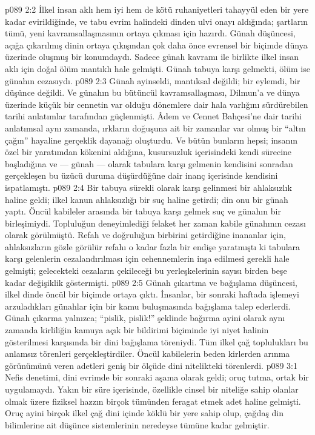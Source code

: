 \vs p089 2:2 İlkel insan aklı hem iyi hem de kötü ruhaniyetleri tahayyül eden bir yere kadar evirildiğinde, ve tabu evrim halindeki dinden ulvi onayı aldığında; şartların tümü,  yeni kavramsallaşmasının ortaya çıkması için hazırdı. Günah düşüncesi, açığa çıkarılmış dinin ortaya çıkışından çok daha önce evrensel bir biçimde dünya üzerinde oluşmuş bir konumdaydı. Sadece günah kavramı ile birlikte ilkel insan aklı için doğal ölüm mantıklı hale gelmişti. Günah tabuya karşı gelmekti, ölüm ise günahın cezasıydı.
\vs p089 2:3 Günah ayinseldi, mantıksal değildi; bir eylemdi, bir düşünce değildi. Ve günahın bu bütüncül kavramsallaşması, Dilmun’a ve dünya üzerinde küçük bir cennetin var olduğu dönemlere dair hala varlığını sürdürebilen tarihi anlatımlar tarafından güçlenmişti. Âdem ve Cennet Bahçesi’ne dair tarihi anlatımsal aynı zamanda, ırkların doğuşuna ait bir zamanlar var olmuş bir “altın çağın” hayaline gerçeklik dayanağı oluşturdu. Ve bütün bunların hepsi; insanın özel bir yaratımdan kökenini aldığına, kusursuzluk içerisindeki kendi sürecine başladığına ve --- günah --- olarak tabulara karşı gelmenin kendisini sonradan gerçekleşen bu üzücü duruma düşürdüğüne dair inanç içerisinde kendisini ispatlamıştı.
\vs p089 2:4 Bir tabuya sürekli olarak karşı gelinmesi bir ahlaksızlık haline geldi; ilkel kanun ahlaksızlığı bir suç haline getirdi; din onu bir günah yaptı. Öncül kabileler arasında bir tabuya karşı gelmek suç ve günahın bir birleşimiydi. Topluluğun deneyimlediği felaket her zaman kabile günahının cezası olarak görülmüştü. Refah ve doğruluğun birbirini getirdiğine inananlar için, ahlaksızların gözle görülür refahı o kadar fazla bir endişe yaratmıştı ki tabulara karşı gelenlerin cezalandırılması için cehennemlerin inşa edilmesi gerekli hale gelmişti; gelecekteki cezaların çekileceği bu yerleşkelerinin sayısı birden beşe kadar değişiklik göstermişti.
\vs p089 2:5 Günah çıkartma ve bağışlama düşüncesi, ilkel dinde öncül bir biçimde ortaya çıktı. İnsanlar, bir sonraki haftada işlemeyi arzuladıkları günahlar için bir kamu buluşmasında bağışlama talep ederlerdi. Günah çıkarma yalnızca; “pislik, pislik!” şeklinde bağırma ayini olarak aynı zamanda kirliliğin kamuya açık bir bildirimi biçiminde iyi niyet halinin gösterilmesi karşısında bir dini bağışlama töreniydi. Tüm ilkel çağ toplulukları bu anlamsız törenleri gerçekleştirdiler. Öncül kabilelerin beden kirlerden arınma görünümünü veren adetleri geniş bir ölçüde dini nitelikteki törenlerdi.
\vs p089 3:1 Nefis denetimi, dini evrimde bir sonraki aşama olarak geldi; oruç tutma, ortak bir uygulamaydı. Yakın bir süre içerisinde, özellikle cinsel bir niteliğe sahip olanlar olmak üzere fiziksel hazzın birçok tümünden feragat etmek adet haline gelmişti. Oruç ayini birçok ilkel çağ dini içinde köklü bir yere sahip olup, çağdaş din bilimlerine ait düşünce sistemlerinin neredeyse tümüne kadar gelmiştir.

